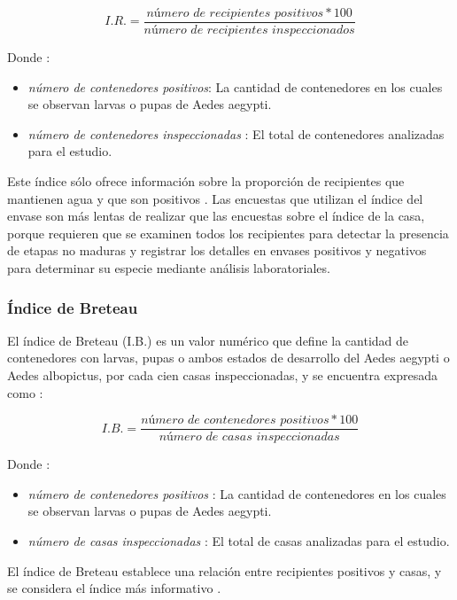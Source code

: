 \begin{equation}
I.R. = \frac{\textit{número de recipientes positivos} * 100}{\textit{número de recipientes inspeccionados}}
\end{equation}

Donde :
\begin{itemize}
\item \textit{número de contenedores positivos}: La cantidad de contenedores en los cuales se observan larvas o pupas de Aedes aegypti.
\item \textit{número de contenedores inspeccionadas} : El total de contenedores analizadas para el estudio.
\end{itemize}

Este índice sólo ofrece información sobre la proporción de recipientes que mantienen agua y que
son positivos \cite{world2009dengue}. Las encuestas que utilizan el índice del envase son más
lentas de realizar que las encuestas sobre el índice de la casa, porque requieren que se
examinen todos los recipientes para detectar la presencia de etapas no maduras y registrar los
detalles en envases positivos y negativos para determinar su especie mediante análisis
laboratoriales.

\subsubsection{Índice de Breteau}
El índice de Breteau (I.B.) es un valor numérico que define la cantidad de contenedores con
larvas, pupas o ambos estados de desarrollo del Aedes aegypti o Aedes albopictus, por cada cien
casas inspeccionadas\cite{ibanez1995vectores, MARQUES1993,world2009dengue}, y se encuentra
expresada como :

\begin{equation}
I.B. = \frac{\textit{número de contenedores positivos} * 100}{\textit{número de casas inspeccionadas}}
\end{equation}

Donde :
\begin{itemize}
\item \textit{número de contenedores positivos} : La cantidad de contenedores en los cuales se observan larvas o pupas de Aedes aegypti.
\item \textit{número de casas inspeccionadas} : El total de casas analizadas para el estudio.
\end{itemize}

El índice de Breteau establece una relación entre recipientes positivos y casas, y se considera el
índice más informativo \cite{world2009dengue}.

